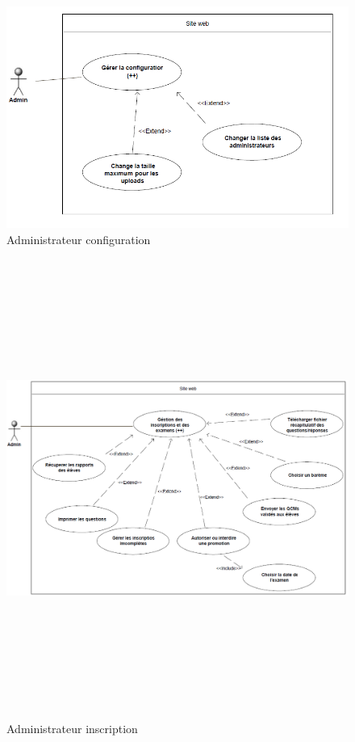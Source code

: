     \begin{figure}[h]
        \begin{center}
            \includegraphics[scale=0.75]{images/uml/adminConfiguration.png} 
        \end{center}

        \caption{Administrateur configuration}
        \label{Administrateur configuration}
    \end{figure}

    \begin{figure}[h]
        \begin{center}
            \includegraphics[width=18cm,height=15cm, angle=90]{images/uml/adminInscriptionsExamens.png} 
        \end{center}

        \caption{Administrateur inscription}
        \label{Administrateur inscription}
    \end{figure}

